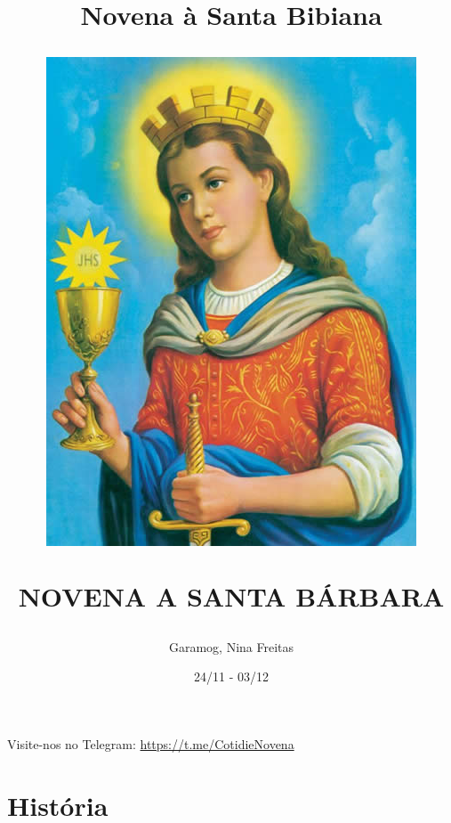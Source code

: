 \documentclass[11pt]{article}
\title{Novena à Santa Bibiana}
\title{
  \includegraphics[scale=0.7]{./assets/imagem.jpg}
  \par
  NOVENA A SANTA BÁRBARA}
\author{Garamog, Nina Freitas}
\date{24/11 - 03/12}
\begin{document}
\maketitle

\pagestyle{fancy}
\fancyhf{} %
\fancyfoot[R]{\thepage}
  
\newpage

\tableofcontents

\centering
\vfill
Visite-nos no Telegram: \url{https://t.me/CotidieNovena}
\newpage


\section{História}\label{historia}
\end{document}
